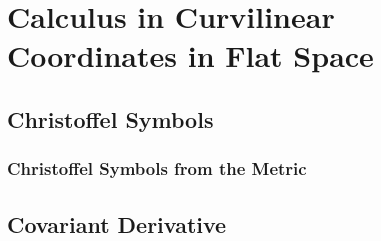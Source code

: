 \setchapterpreamble[u]{\margintoc}
\chapter{Calculus in Curvilinear Coordinates in Flat Space}

\section{Christoffel Symbols}
\subsection{Christoffel Symbols from the Metric}
\section{Covariant Derivative}
